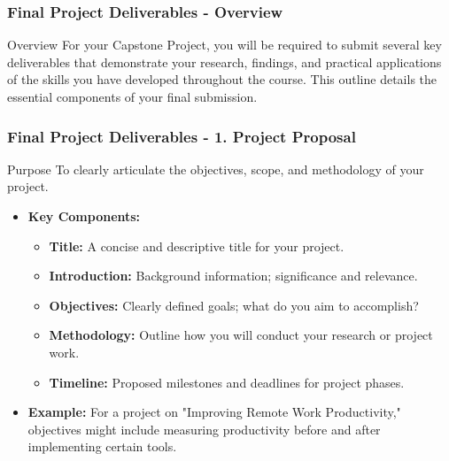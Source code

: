 \documentclass[aspectratio=169]{beamer}
\begin{document}
\begin{frame}[fragile]
  \frametitle{Final Project Deliverables - Overview}
  \begin{block}{Overview}
    For your Capstone Project, you will be required to submit several key deliverables that demonstrate your research, findings, and practical applications of the skills you have developed throughout the course. 
    This outline details the essential components of your final submission.
  \end{block}
\end{frame}

\begin{frame}[fragile]
  \frametitle{Final Project Deliverables - 1. Project Proposal}
  \begin{block}{Purpose}
    To clearly articulate the objectives, scope, and methodology of your project.
  \end{block}
  \begin{itemize}
    \item \textbf{Key Components:}
      \begin{itemize}
        \item \textbf{Title:} A concise and descriptive title for your project.
        \item \textbf{Introduction:} Background information; significance and relevance.
        \item \textbf{Objectives:} Clearly defined goals; what do you aim to accomplish? 
        \item \textbf{Methodology:} Outline how you will conduct your research or project work.
        \item \textbf{Timeline:} Proposed milestones and deadlines for project phases.
      \end{itemize}
    \item \textbf{Example:} For a project on "Improving Remote Work Productivity," objectives might include measuring productivity before and after implementing certain tools.
  \end{itemize}
\end{frame}
\end{document}

